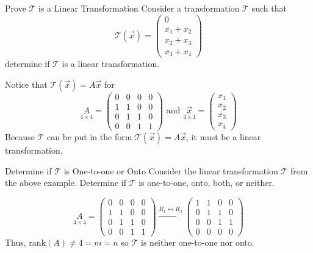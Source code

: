 \newpage 

\begin{example}{Prove $\mathcal{T}$ is a Linear Transformation}{}
    Consider a transformation $\mathcal{T}$ such that 
    \[\mathcal{T}\left(\vec{x}\right) = 
    \begin{pmatrix}
        0 \\ x_1 + x_2 \\ x_2 + x_3 \\ x_3 + x_4
    \end{pmatrix}\]
    determine if $\mathcal{T}$ is a linear transformation.
    \begin{solution}
        Notice that $\mathcal{T}\left(\vec{x}\right) = A\vec{x}$ for 
        \[
            \underset{4 \times 4}{A} = \begin{pmatrix}
                0 & 0 & 0 & 0 \\
                1 & 1 & 0 & 0 \\
                0 & 1 & 1 & 0 \\
                0 & 0 & 1 & 1
            \end{pmatrix}
            \text{ and }
            \underset{4 \times 1}{\vec{x}} = \begin{pmatrix}
                x_1 \\ x_2 \\ x_3 \\ x_4
            \end{pmatrix}
        \]
        Because $\mathcal{T}$ can be put in the form $\mathcal{T}\left(\vec{x}\right) = A\vec{x}$, it must be a linear transformation.
    \end{solution}
\end{example}

\begin{example}{Determine if $\mathcal{T}$ is One-to-one or Onto}{}
    Consider the linear transformation $\mathcal{T}$ from the above example. Determine if $\mathcal{T}$ is one-to-one, onto, both, or neither.
    \begin{solution}
        \[
            \underset{4 \times 4}{A} = \begin{pmatrix}
                0 & 0 & 0 & 0 \\
                1 & 1 & 0 & 0 \\
                0 & 1 & 1 & 0 \\
                0 & 0 & 1 & 1
            \end{pmatrix} 
            \xrightarrow{R_1 \leftrightarrow R_4}
            \begin{pmatrix}
                1 & 1 & 0 & 0 \\
                0 & 1 & 1 & 0 \\
                0 & 0 & 1 & 1 \\
                0 & 0 & 0 & 0 
            \end{pmatrix} 
        \]
        Thus, $\text{rank}\left(A\right) \ne 4 = m = n$ so $\mathcal{T}$ is neither one-to-one nor onto.
    \end{solution}
\end{example}

